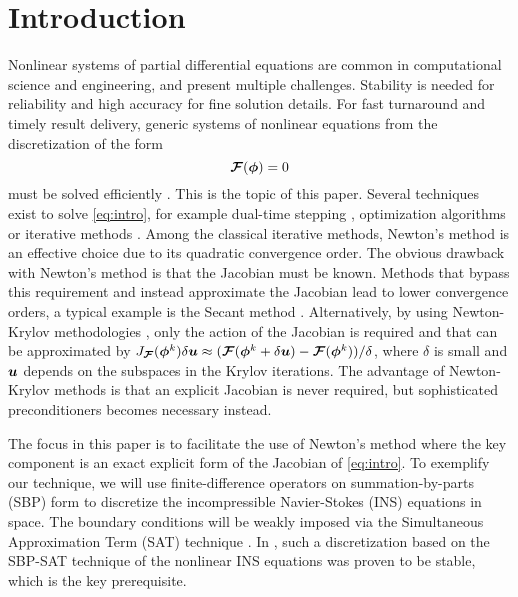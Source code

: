 \section{Introduction}%
\label{sec:introduction}
Nonlinear systems of partial differential equations are common in computational science and engineering, and present multiple challenges. Stability is needed for reliability and high accuracy for fine solution details. For fast turnaround and timely result delivery, generic systems of nonlinear equations from the discretization of the form
\begin{equation}
  \Fn(\soln) = 0
  \label{eq:intro}
\end{equation}
must be solved efficiently \cite{quarteroni2010numerical}. This is the topic of this paper. Several techniques exist to solve \eqref{eq:intro}, for example dual-time stepping \cite{jameson1991time,nordstrom2019dual}, optimization algorithms \cite{nocedal2006numerical} or iterative methods \cite{quarteroni2010numerical}. Among the classical iterative methods, Newton's method is an effective choice due to its quadratic convergence order. The obvious drawback with Newton's method is that the Jacobian must be known. Methods that bypass this requirement and instead approximate the Jacobian lead to lower convergence orders, a typical example is the Secant method \cite{quarteroni2010numerical}. Alternatively, by using Newton-Krylov methodologies \cite{knoll2004jacobian}, only the action of the Jacobian is required and that can be approximated by $J_{\bm{\mathcal{F}}}(\bm{\phi}^k) \delta \bm{u} \approx (\bm{\mathcal{F}}(\bm{\phi}^k + \delta \bm{u}) - \bm{\mathcal{F}}(\bm{\phi}^k))/\delta$, where $\delta$ is small and $\bm{u}$ depends on the subspaces in the Krylov iterations. The advantage of Newton-Krylov methods is that an explicit Jacobian is never required, but sophisticated preconditioners becomes necessary \cite{brown1990hybrid} instead.

The focus in this paper is to facilitate the use of Newton's method where the key component is an exact explicit form of the Jacobian of \eqref{eq:intro}. To exemplify our technique, we will use finite-difference operators on summation-by-parts (SBP) form \cite{svard2014review} to discretize the incompressible Navier-Stokes (INS) equations in space. The boundary conditions will be weakly imposed via the Simultaneous Approximation Term (SAT) technique \cite{carpenter1994time}. In \cite{nordstrom2019energy}, such a discretization based on the SBP-SAT technique of the nonlinear INS equations was proven to be stable, which is the key prerequisite.

